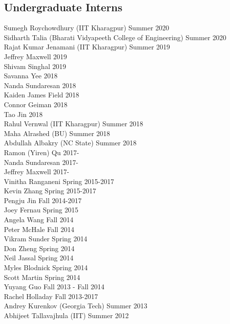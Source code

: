 \subsection{Undergraduate Interns}
\noindent
Sumegh Roychowdhury (IIT Kharagpur) \hfill Summer 2020 \\
Sidharth Talia (Bharati Vidyapeeth College of Engineering) \hfill Summer 2020 \\
Rajat Kumar Jenamani (IIT Kharagpur) \hfill Summer 2019\\
Jeffrey Maxwell \hfill 2019\\
Shivam Singhal \hfill 2019\\
Savanna Yee \hfill 2018\\
Nanda Sundaresan \hfill 2018\\
Kaiden James Field \hfill 2018\\
Connor Geiman \hfill 2018\\
Tao Jin \hfill 2018	\\
Rahul Vernwal (IIT Kharagpur) \hfill Summer 2018\\
Maha Alrashed (BU) \hfill Summer 2018\\
Abdullah Albakry (NC State) \hfill Summer 2018\\
Ramon (Yiren) Qu \hfill 2017-\\
Nanda Sundaresan \hfill 2017-\\
Jeffrey Maxwell \hfill 2017-\\
Vinitha Ranganeni \hfill Spring 2015-2017\\
Kevin Zhang  \hfill Spring 2015-2017\\
Pengju Jin  \hfill Fall 2014-2017\\
Joey Fernau  \hfill Spring 2015\\
Angela Wang  \hfill Fall 2014\\
Peter McHale  \hfill Fall 2014\\
Vikram Sunder  \hfill Spring 2014\\
Don Zheng  \hfill Spring 2014\\
Neil Jassal  \hfill Spring 2014\\
Myles Blodnick  \hfill Spring 2014\\
Scott Martin  \hfill Spring 2014\\
Yuyang Guo  \hfill Fall 2013 - Fall 2014\\
Rachel Holladay  \hfill Fall 2013-2017\\
Andrey Kurenkov (Georgia Tech) \hfill Summer 2013\\ 
Abhijeet Tallavajhula (IIT) \hfill Summer 2012\\
